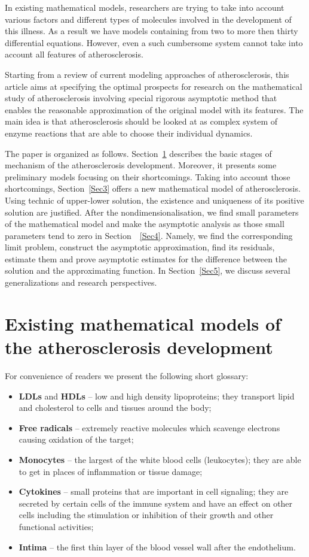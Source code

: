 \documentclass[reqno]{amsart}            %
\numberwithin{equation}{section}
\begin{document}
In existing mathematical models, researchers are trying to take into account various factors and different types of molecules involved in the development of this illness. As a result we have models containing from two to more then thirty differential equations.
However, even a such cumbersome system cannot take into account all features of atherosclerosis.

Starting from a review of current modeling approaches of atherosclerosis, this article aims at specifying the optimal prospects for research on the mathematical study of atherosclerosis involving special rigorous asymptotic method that enables the reasonable approximation of the original model with its features. The main idea is that atherosclerosis should be looked at as complex system of enzyme reactions that are able to choose their individual dynamics.

The paper is organized as follows.
Section~\ref{Sec2} describes the basic stages of  mechanism of the atherosclerosis development. Moreover, it presents some preliminary
models focusing on their shortcomings. Taking into account those shortcomings, Section~\ref{Sec3}  offers a new mathematical model of atherosclerosis. Using technic of upper-lower solution,  the existence and uniqueness of its positive solution are justified. After the nondimensionalisation, we find small parameters  of the mathematical model and make the asymptotic analysis as those small parameters tend to zero in Section~~\ref{Sec4}. Namely, we find the corresponding limit problem, construct the asymptotic approximation, find its residuals, estimate them and prove asymptotic estimates for the difference between the solution and the approximating function. In Section~\ref{Sec5}, we discuss several generalizations and research perspectives.

\section{Existing mathematical models of the atherosclerosis development}\label{Sec2}

For convenience of readers we present the following short glossary:
\begin{itemize}
\item
{\bf LDLs} and {\bf HDLs}  --  low and high density lipoproteins; they transport lipid and cholesterol
to cells and tissues around the body;
\item
{\bf Free radicals} --  extremely reactive molecules which scavenge electrons causing oxidation of the target;
\item
{\bf Monocytes} --  the largest of the white blood cells (leukocytes); they are able to get in  places of
inflammation or tissue damage;
\item
{\bf Cytokines} -- small proteins that are important in cell signaling; they are secreted by certain cells
of the immune system and have an effect on other cells including the stimulation or inhibition of their growth
 and other functional activities;
\item
{\bf Intima} -- the first thin layer of the blood vessel wall after the endothelium.
\end{itemize}
\end{document}
